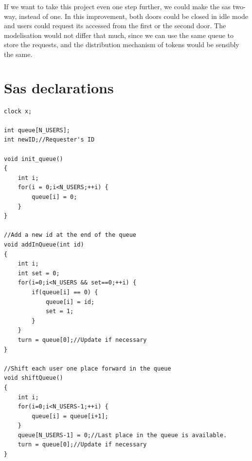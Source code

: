 \documentclass[10pt,a4paper]{article}
\begin{document}
If we want to take this project even one step further, we could make the sas two-way, instead of one.
In this improvement, both doors could be closed in idle mode and users could request its accessed from the first or the second door.
The modelisation would not differ that much, since we can use the same queue to store the requests, and the distribution mechanism of tokens would be sensibly the same.

\newpage
\appendix
\section{Sas declarations}
\begin{lstlisting}[caption=Sas model declarations., label=lst:sasDecl]
clock x;

int queue[N_USERS];
int newID;//Requester's ID

void init_queue()
{	
	int i;
	for(i = 0;i<N_USERS;++i) {
		queue[i] = 0;
	}
}

//Add a new id at the end of the queue
void addInQueue(int id) 
{
	int i;
	int set = 0;
	for(i=0;i<N_USERS && set==0;++i) {
		if(queue[i] == 0) {
			queue[i] = id;
			set = 1;
		}
	}
	turn = queue[0];//Update if necessary
}

//Shift each user one place forward in the queue
void shiftQueue()
{
	int i;
	for(i=0;i<N_USERS-1;++i) {
		queue[i] = queue[i+1];
	}
	queue[N_USERS-1] = 0;//Last place in the queue is available.
	turn = queue[0];//Update if necessary
}
\end{lstlisting}
\end{document}
